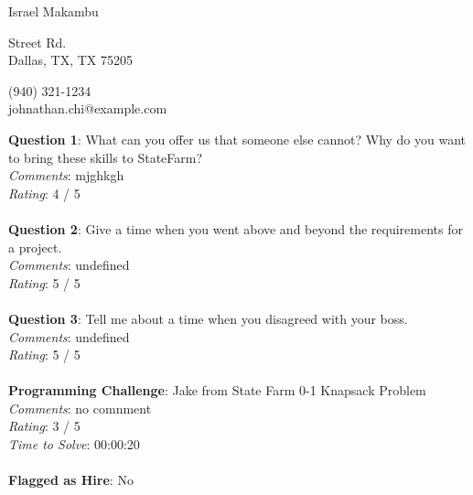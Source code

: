 \documentclass[12pt]{article}
\begin{document}
{\LARGE \begin{center}Israel Makambu\end{center}}

\begin{multicols}{2}
 Street Rd. \\
Dallas, TX, TX 75205
\columnbreak

\noindent
(940) 321-1234 \\
johnathan.chi@example.com
\end{multicols}

\noindent
\textbf{Question 1}: What can you offer us that someone else cannot? Why do you want to bring these skills to StateFarm?
\\\noindent
\textit{Comments}: mjghkgh
\\\noindent
\textit{Rating}: 4 / 5
\\\\
\noindent
\textbf{Question 2}: Give a time when you went above and beyond the requirements for a project.
\\\noindent
\textit{Comments}: undefined
\\\noindent
\textit{Rating}: 5 / 5
\\\\
\noindent
\textbf{Question 3}: Tell me about a time when you disagreed with your boss.
\\\noindent
\textit{Comments}: undefined
\\\noindent
\textit{Rating}: 5 / 5
\\\\
\noindent
\textbf{Programming Challenge}: Jake from State Farm 0-1 Knapsack Problem
\\\noindent
\textit{Comments}: no comnment
\\\noindent
\textit{Rating}: 3 / 5
\\\noindent
\textit{Time to Solve}: 00:00:20
\\\\
\textbf{Flagged as Hire}: No
\\\\ 
\end{document}
